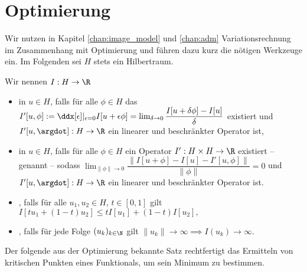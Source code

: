 \documentclass{mythesis}
\begin{document}
\section*{Optimierung}

Wir nutzen in Kapitel \ref{chap:image_model} und \ref{chap:adm} Variationsrechnung im Zusammenhang mit Optimierung und führen dazu kurz die nötigen Werkzeuge ein.
Im Folgenden sei $H$ stets ein Hilbertraum.

\begin{definition} \label{definition:min_stuff}
    Wir nennen $I: H \to \R$
    \begin{itemize}
	\item
	     in $u \in H$,
            falls für alle $\phi \in H$ das 
	    \begin{math}
		I'[u, \phi]
		:= \ddx[\epsilon]|_{\epsilon = 0} I[u + \epsilon \phi]
		= \lim_{\delta \to 0} \dfrac{I[u + \delta \phi] - I[u]}{\delta}
	    \end{math}
	    existiert und $I'[u, \argdot]: H \to \R$ ein linearer und beschränkter Operator ist,
	\item
	     in $u \in H$,
	    falls für alle $\phi \in H$ ein Operator $I': H \times H \to \R$ existiert – genannt  – sodass
	    \begin{math}
		\lim_{\|\phi\| \to 0} \dfrac{\|I[u+\phi] - I[u] - I'[u,\phi]\|}{\|\phi\|} = 0
	    \end{math}
	    und $I'[u,\argdot]: H \to \R$ ein linearer und beschränkter Operator ist.
        \item
	    ,
	    falls für alle $u_1, u_2 \in H$, $t \in [0,1]$ gilt
	    \begin{math}
		I[t u_1 + (1-t) u_2]
		\le tI[u_1] + (1-t)I[u_2],
	    \end{math}
	\item
	    ,
	    falls für jede Folge $(u_k)_{k\in\N}$ gilt
	    \begin{math}
		\|u_k\| \to \infty \implies I(u_k) \to \infty.
	    \end{math}
    \end{itemize}
\end{definition}

Der folgende aus der Optimierung bekannte Satz rechtfertigt das Ermitteln von kritischen Punkten eines Funktionals, um sein Minimum zu bestimmen.
\end{document}
